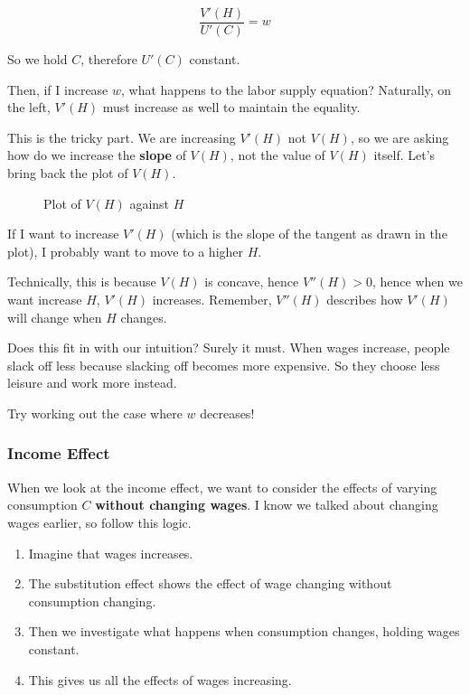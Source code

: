 \documentclass[11pt]{scrartcl}
\begin{document}
\[\frac{V'(H)}{U'(C)} = w\]

So we hold $C$, therefore $U'(C)$ constant.

Then, if I increase $w$, what happens to the labor supply equation? Naturally, on the left, $V'(H)$ must increase as well to maintain the equality. 

This is the tricky part. We are increasing $V'(H)$ not $V(H)$, so we are asking how do we increase the \textbf{slope} of $V(H)$, not the value of $V(H)$ itself. Let's bring back the plot of $V(H)$.

\begin{figure}[ht!]
\centering
{}
\caption{Plot of $V(H)$ against $H$}
\end{figure}

If I want to increase $V'(H)$ (which is the slope of the tangent as drawn in the plot), I probably want to move to a higher $H$.

Technically, this is because $V(H)$ is concave, hence $V''(H) > 0$, hence when we want increase $H$, $V'(H)$ increases. Remember, $V''(H)$ describes how $V'(H)$ will change when $H$ changes.

Does this fit in with our intuition? Surely it must. When wages increase, people slack off less because slacking off becomes more expensive. So they choose less leisure and work more instead.

Try working out the case where $w$ decreases!

\subsubsection{Income Effect}
When we look at the income effect, we want to consider the effects of varying consumption $C$ \textbf{without changing wages}. I know we talked about changing wages earlier, so follow this logic.

\begin{enumerate}
	\item Imagine that wages increases.
	\item The substitution effect shows the effect of wage changing without consumption changing. 
	\item Then we investigate what happens when consumption changes, holding wages constant.
	\item This gives us all the effects of wages increasing.
\end{enumerate}
\end{document}

